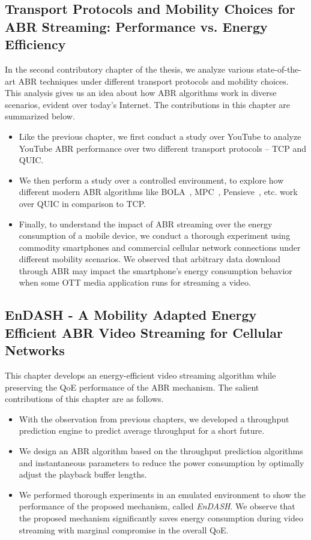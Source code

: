 \subsection{Transport Protocols and Mobility Choices for ABR Streaming: Performance vs. Energy Efficiency}
In the second contributory chapter of the thesis, we analyze various state-of-the-art \ac{ABR} techniques under different transport protocols and mobility choices. This analysis gives us an idea about how \ac{ABR} algorithms work in diverse scenarios, evident over today's Internet. The contributions in this chapter are summarized below. 
\begin{itemize}
	\item Like the previous chapter, we first conduct a study over YouTube to analyze YouTube \ac{ABR} performance over two different transport protocols -- \ac{TCP} and \ac{QUIC}.
	\item We then perform a study over a controlled environment, to explore how different modern \ac{ABR} algorithms like BOLA~\cite{Spiteri2016}, MPC~\cite{yin2015control}, Pensieve~\cite{mao2017neural}, etc. work over \ac{QUIC} in comparison to \ac{TCP}.
	\item Finally, to understand the impact of \ac{ABR} streaming over the energy consumption of a mobile device, we conduct a thorough experiment using commodity smartphones and commercial cellular network connections under different mobility scenarios. We observed that arbitrary data download through \ac{ABR} may impact the smartphone's energy consumption behavior when some \ac{OTT} media application runs for streaming a video. 
\end{itemize}

\subsection{EnDASH - A Mobility Adapted Energy Efficient ABR Video Streaming for Cellular Networks}
This chapter develops an energy-efficient video streaming algorithm while preserving the \ac{QoE} performance of the \ac{ABR} mechanism. The salient contributions of this chapter are as follows. 
\begin{itemize}
	\item With the observation from previous chapters, we developed a throughput prediction engine to predict average throughput for a short future.
	\item We design an \ac{ABR} algorithm based on the throughput prediction algorithms and instantaneous parameters to reduce the power consumption by optimally adjust the playback buffer lengths.
	\item We performed thorough experiments in an emulated environment to show the performance of the proposed mechanism, called \textit{EnDASH}. We observe that the proposed mechanism significantly saves energy consumption during video streaming with marginal compromise in the overall \ac{QoE}. 
\end{itemize}

